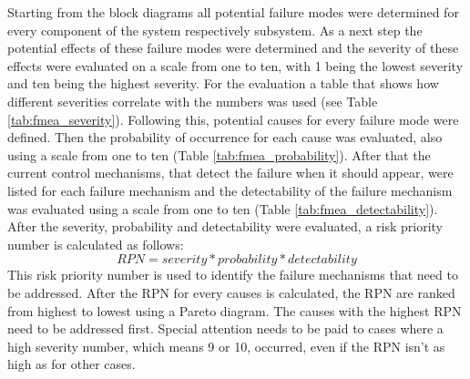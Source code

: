 \documentclass[ExampleMasters.tex]{subfiles}
\begin{document}
Starting from the block diagrams all potential failure modes were determined for every component of the system respectively subsystem. As a next step the potential effects of these failure modes were determined and the severity of these effects were evaluated on a scale from one to ten,  with 1 being the lowest severity and ten being the highest severity. For the evaluation a table that shows how different severities correlate with the numbers was used (see Table \ref{tab:fmea_severity}). 
Following this, potential causes for every failure mode were defined. Then the probability of occurrence for each cause was evaluated, also using a scale from one to ten (Table \ref{tab:fmea_probability}).
After that the current control mechanisms, that detect the failure when it should appear, were listed for each failure mechanism and the detectability of the failure mechanism was evaluated using a scale from one to ten (Table \ref{tab:fmea_detectability}).
After the severity, probability and detectability were evaluated, a risk priority number is calculated as follows: 
\begin{equation*}
RPN=severity*probability*detectability
\end{equation*}      
This risk priority number is used to identify the failure mechanisms that need to be addressed. After the RPN for every causes is calculated, the RPN are ranked from highest to lowest using a Pareto diagram. The causes with the highest RPN need to be addressed first. Special attention needs to be paid to cases where a high severity number, which means 9 or 10, occurred, even if the RPN isn't as high as for other cases. 
		
\end{document}
